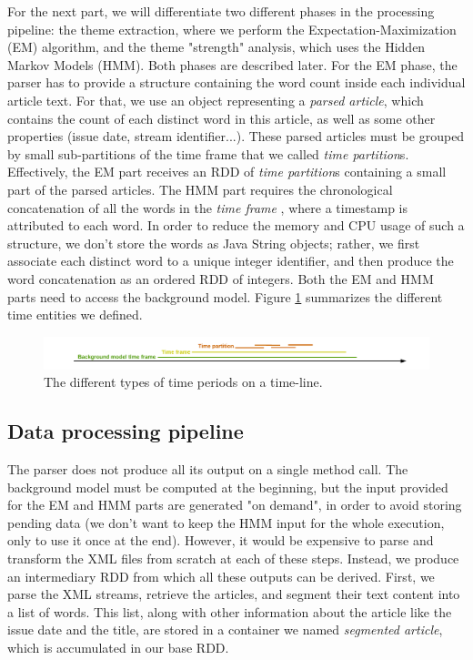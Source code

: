 For the next part, we will differentiate two different phases in the processing pipeline: the theme extraction, where we perform the Expectation-Maximization (EM) algorithm, and the theme "strength" analysis, which uses the Hidden Markov Models (HMM). Both phases are described later. For the EM phase, the parser has to provide a structure containing the word count inside each individual article text. For that, we use an object representing a \emph{parsed article}, which contains the count of each distinct word in this article, as well as some other properties (issue date, stream identifier...). These parsed articles must be grouped by small sub-partitions of the time frame that we called \emph{time partition}s. Effectively, the EM part receives an RDD of \emph{time partition}s containing a small part of the parsed articles. The HMM part requires the chronological concatenation of all the words in the \emph{time frame} , where a timestamp is attributed to each word. In order to reduce the memory and CPU usage of such a structure, we don't store the words as Java String objects; rather, we first associate each distinct word to a unique integer identifier, and then produce the word concatenation as an ordered RDD of integers. Both the EM and HMM parts need to access the background model. Figure \ref{fig:time_entities} summarizes the different time entities we defined.

\begin{figure}
   \includegraphics[width=\textwidth]{time_entities.pdf}
   \caption{\label{fig:time_entities} The different types of time periods on a time-line.}
\end{figure}


\subsection{Data processing pipeline}
The parser does not produce all its output on a single method call. The background model must be computed at the beginning, but the input provided for the EM and HMM parts are generated "on demand", in order to avoid storing pending data (we don't want to keep the HMM input for the whole execution, only to use it once at the end). However, it would be expensive to parse and transform the XML files from scratch at each of these steps. Instead, we produce an intermediary RDD from which all these outputs can be derived. First, we parse the XML streams, retrieve the articles, and segment their text content into a list of words. This list, along with other information about the article like the issue date and the title, are stored in a container we named \emph{segmented article}, which is accumulated in our base RDD.

